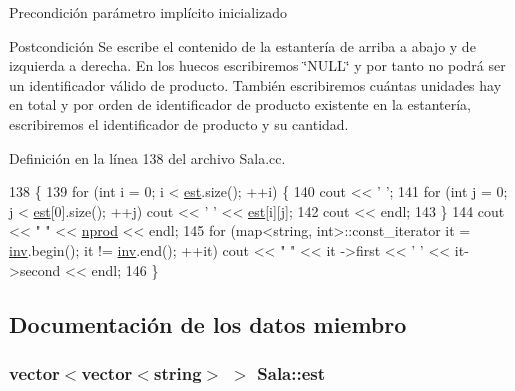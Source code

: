 \begin{DoxyPrecond}{Precondición}
parámetro implícito inicializado 
\end{DoxyPrecond}
\begin{DoxyPostcond}{Postcondición}
Se escribe el contenido de la estantería de arriba a abajo y de izquierda a derecha. En los huecos escribiremos \char`\"{}\+N\+U\+L\+L\char`\"{} y por tanto no podrá ser un identificador válido de producto. También escribiremos cuántas unidades hay en total y por orden de identificador de producto existente en la estantería, escribiremos el identificador de producto y su cantidad. 
\end{DoxyPostcond}


Definición en la línea 138 del archivo Sala.\+cc.


\begin{DoxyCode}
138                           \{
139     \textcolor{keywordflow}{for} (\textcolor{keywordtype}{int} i = 0; i < \hyperlink{class_sala_a10ff1925bdd8bddd25a0a3c05a5de0cc}{est}.size(); ++i) \{
140         cout << \textcolor{charliteral}{' '};
141         \textcolor{keywordflow}{for} (\textcolor{keywordtype}{int} j = 0; j < \hyperlink{class_sala_a10ff1925bdd8bddd25a0a3c05a5de0cc}{est}[0].size(); ++j) cout << \textcolor{charliteral}{' '} << \hyperlink{class_sala_a10ff1925bdd8bddd25a0a3c05a5de0cc}{est}[i][j];
142         cout << endl;
143     \}
144     cout << \textcolor{stringliteral}{"  "} << \hyperlink{class_sala_a829a224601bc03ff2355501639907033}{nprod} << endl;
145     \textcolor{keywordflow}{for} (map<string, int>::const\_iterator it = \hyperlink{class_sala_a2d8fbc50706513567b0d975ed0f2e66e}{inv}.begin(); it != \hyperlink{class_sala_a2d8fbc50706513567b0d975ed0f2e66e}{inv}.end(); ++it) cout << \textcolor{stringliteral}{"  "} << it
      ->first << \textcolor{charliteral}{' '} << it->second << endl;
146 \}
\end{DoxyCode}


\subsection{Documentación de los datos miembro}
\subsubsection[{\texorpdfstring{est}{est}}]{\setlength{\rightskip}{0pt plus 5cm}vector$<$vector$<$string$>$ $>$ Sala\+::est\hspace{0.3cm}{\ttfamily [private]}}\hypertarget{class_sala_a10ff1925bdd8bddd25a0a3c05a5de0cc}{}\label{class_sala_a10ff1925bdd8bddd25a0a3c05a5de0cc}


